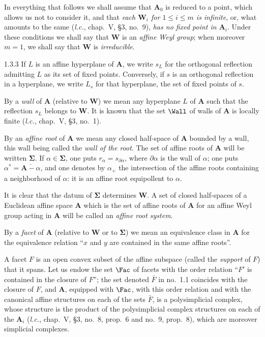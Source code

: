 \documentclass[12pt,a4paper,oneside,english]{smfart}
\makeatletter
\newcommand{\btanchor}[1]{\leavevmode\Hy@raisedlink{\hypertarget{bt:#1}{}}}
\theoremstyle{definition}
\theoremstyle{bt}
\makeatother
\begin{document}
In everything that follows we shall assume that $\mathbf{A}_0$ is reduced to a point, which allows us not to consider it, and that \emph{each $\mathbf{W}_i$ for $1\leqslant i\leqslant m$ is infinite}, or, what amounts to the same (\emph{l.c.}, chap.~V, \S3, no.~9), \emph{has no fixed point in $\mathbf{A}_i$}. Under these conditions we shall say that $\mathbf{W}$ is an
\emph{affine Weyl group}; when moreover $m=1$, we shall say that $\mathbf{W}$
is \emph{irreducible}.

\num{1.3.3}\btanchor{1.3.3} If $L$ is an affine hyperplane of $\mathbf{A}$, we write $s_L$ for
the orthogonal reflection admitting $L$ as its set of fixed points. Conversely, if $s$ is an orthogonal reflection in a hyperplane, we write $L_s$ for that hyperplane, the set of fixed points of $s$.

By a \emph{wall} of $\mathbf{A}$ (relative to $\mathbf{W}$) we mean any hyperplane $L$ of $\mathbf{A}$ such that the reflection $s_L$ belongs to $\mathbf{W}$. It is known that the set $\Wall$ of walls of $\mathbf{A}$ is locally finite (\emph{l.c.}, chap.~V, \S3, no.~1).

By an \emph{affine root} of $\mathbf{A}$ we mean any closed half-space of $\mathbf{A}$ bounded by a wall, this wall being called the \emph{wall of the root}. The set of affine roots of $\mathbf{A}$ will be written $\boldsymbol{\Sigma}$. If $\alpha\in\boldsymbol{\Sigma}$, one puts $r_\alpha=s_{\partial\alpha}$, where $\partial\alpha$ is the wall of $\alpha$; one puts $\alpha^{*}=\overline{\mathbf{A}-\alpha}$, and one denotes by $\alpha_{+}$ the intersection of the affine roots containing a neighborhood of $\alpha$: it is an affine root equipollent to $\alpha$.

It is clear that the datum of $\boldsymbol{\Sigma}$ determines $\mathbf{W}$. A set of closed half-spaces of a Euclidean affine space $\mathbf{A}$ which is the set of affine roots of $\mathbf{A}$ for an affine Weyl group acting in $\mathbf{A}$ will be called an \emph{affine root system}.

By a \emph{facet} of $\mathbf{A}$ (relative to $\mathbf{W}$ or to $\boldsymbol{\Sigma}$) we mean an equivalence class in $\mathbf{A}$ for the equivalence relation ``$x$ and $y$ are contained in the same affine roots''.

A facet $F$ is an open convex subset of the affine subspace (called the
\emph{support} of $F$) that it spans. Let us endow the set $\Fac$ of facets
with the order relation ``$F'$ is contained in the closure of $F$''; the set denoted $\bar F$ in no.~1.1 coincides with the closure of $F$, and $\mathbf{A}$, equipped with $\Fac$, with this order relation and with the canonical affine structures on each of the sets $\bar F$, is a polysimplicial complex, whose structure is the product of the polysimplicial complex structures on each of the $\mathbf{A}_i$ (\emph{l.c.}, chap.~V, \S3, no.~8, prop.~6 and no.~9, prop.~8), which are moreover simplicial complexes.
\end{document}
